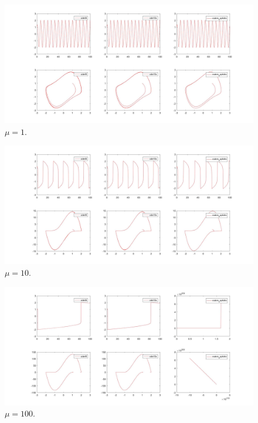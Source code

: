 \documentclass[11pt,a4paper,twoside,openright,titlepage,
headinclude,footinclude,BCOR5mm,
numbers=noenddot,cleardoublepage=empty,
tablecaptionabove]{scrbook}
\begin{document}
\begin{center}
\begin{figure}[h!]
\includegraphics[width=\textwidth]{figs/esercizio3_2.jpg}
\caption{$\mu = 1$.}
\end{figure}
\end{center}

\begin{center}
\begin{figure}[h!]
\includegraphics[width=\textwidth]{figs/esercizio3_3.jpg}
\caption{$\mu = 10$.}
\end{figure}
\end{center}

\begin{center}
\begin{figure}[t!]
\includegraphics[width=\textwidth]{figs/esercizio3_4.jpg}
\caption{$\mu = 100$.}
\end{figure}
\end{center}
\end{document}
